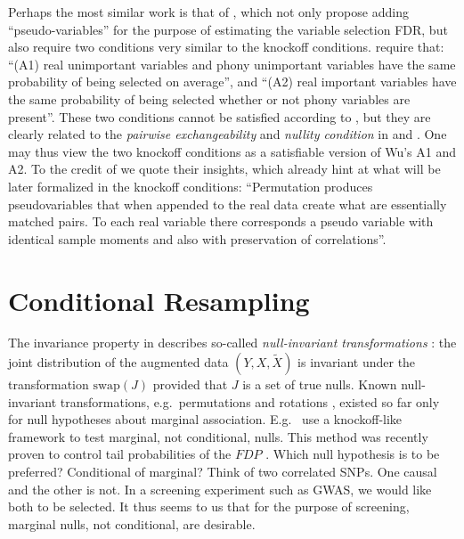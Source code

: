 \documentclass[article,lineno]{biometrika}
\begin{document}
	Perhaps the most similar work is that of \cite{WuControllingVariableSelection2007}, which not only propose adding ``pseudo-variables'' for the purpose of estimating the variable selection \rm{FDR}, but also require two conditions very similar to the knockoff conditions.
	\cite{WuControllingVariableSelection2007} require that:
	``(A1) real unimportant variables and phony unimportant variables have the same probability of being selected on average'', and
	``(A2) real important variables have the same probability of being selected whether or not phony variables are present''.
	These two conditions cannot be satisfied according to \cite{WuControllingVariableSelection2007}, but they are clearly related to the \emph{pairwise exchangeability} and \emph{nullity condition} in \cite{SesiaGenehuntinghidden} and \cite{CandesPanninggoldmodelX2018}.
	One may thus view the two knockoff conditions as a satisfiable version of Wu's A1 and A2.
	To the credit of \cite{WuControllingVariableSelection2007} we quote their insights, which already hint at what will be later formalized in the knockoff conditions:
	``Permutation produces pseudovariables that when appended to the real data create what
	are essentially matched pairs. To each real variable there corresponds a pseudo variable with identical sample moments and also with preservation of correlations''.
	
	
	
	\section{Conditional Resampling}
	The invariance property in \cite{SesiaGenehuntinghidden} describes so-called \emph{null-invariant transformations} \citep{Goeman2010}:
	the joint distribution of the augmented data $(Y,X,\tilde X)$ is invariant under the transformation $\textrm{swap}(J)$ provided that $J$ is a set of true nulls.
	Known null-invariant transformations, e.g.\ permutations and rotations \citep{Langsrud2005}, existed so far only for null hypotheses about marginal association.
	E.g.\ \citet{TusherSignificanceanalysismicroarrays2001} use a knockoff-like framework to test marginal, not conditional, nulls. This method was recently proven to control tail probabilities of the $FDP$ \citep{Hemerik2018}.
	Which null hypothesis is to be preferred? Conditional of marginal?
	Think of two correlated SNPs.
	One causal and the other is not.
	In a screening experiment such as GWAS, we would like both to be selected.
	It thus seems to us that for the purpose of screening, marginal nulls, not conditional, are desirable.
	
\end{document}

